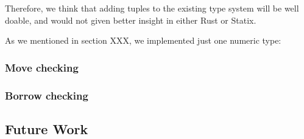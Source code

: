 Therefore, we think that adding tuples to the existing type system will be well doable, and would not given better insight in either Rust or Statix.






As we mentioned in section XXX, we implemented just one numeric type: 

\subsubsection{Move checking}


\subsubsection{Borrow checking}


\subsection{Future Work}\label{s:future_work}
